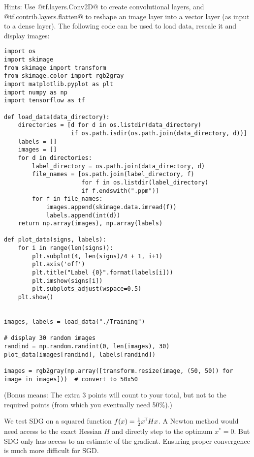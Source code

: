 Hints: Use @tf.layers.Conv2D@ to create convolutional layers, and\\ @tf.contrib.layers.flatten@ to reshape an image layer into a vector layer (as input to a dense layer). The following code can be used to load data, rescale it and display images:
\begin{code}%
\begin{verbatim}
import os
import skimage
from skimage import transform
from skimage.color import rgb2gray
import matplotlib.pyplot as plt
import numpy as np
import tensorflow as tf

def load_data(data_directory):
    directories = [d for d in os.listdir(data_directory)
                   if os.path.isdir(os.path.join(data_directory, d))]
    labels = []
    images = []
    for d in directories:
        label_directory = os.path.join(data_directory, d)
        file_names = [os.path.join(label_directory, f)
                      for f in os.listdir(label_directory)
                      if f.endswith(".ppm")]
        for f in file_names:
            images.append(skimage.data.imread(f))
            labels.append(int(d))
    return np.array(images), np.array(labels)

def plot_data(signs, labels):
    for i in range(len(signs)):
        plt.subplot(4, len(signs)/4 + 1, i+1)
        plt.axis('off')
        plt.title("Label {0}".format(labels[i]))
        plt.imshow(signs[i])
        plt.subplots_adjust(wspace=0.5)
    plt.show()


images, labels = load_data("./Training")

# display 30 random images
randind = np.random.randint(0, len(images), 30)
plot_data(images[randind], labels[randind])

images = rgb2gray(np.array([transform.resize(image, (50, 50)) for image in images]))  # convert to 50x50
\end{verbatim}
\end{code}



(Bonus means: The extra 3 points will count to your total, but not to the required points (from which you eventually need 50\%).)

We test SDG on a squared function $f(x) = \frac{1}{2} x^{\!\top\!} H x$. A Newton
method would need access to the exact Hessian $H$ and directly step to
the optimum $x^*=0$. But SDG only has access to an estimate of the
gradient. Ensuring proper convergence is much more difficult for SGD.

